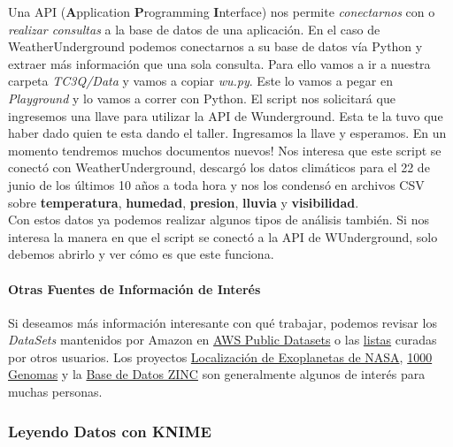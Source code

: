 \documentclass[10pt,letterpaper]{article}
\begin{document}
Una API (\textbf{A}pplication \textbf{P}rogramming \textbf{I}nterface) nos permite \emph{conectarnos} con o \emph{realizar consultas} a la base de datos de una aplicaci\'on. En el caso de WeatherUnderground podemos conectarnos a su base de datos v\'ia Python y extraer m\'as informaci\'on que una sola consulta. Para ello vamos a ir a nuestra carpeta \textit{TC3Q/Data} y vamos a copiar \textit{wu.py}. Este lo vamos a pegar en \textit{Playground} y lo vamos a correr con Python. El script nos solicitar\'a que ingresemos una llave para utilizar la API de Wunderground. Esta te la tuvo que haber dado quien te esta dando el taller. Ingresamos la llave y esperamos. En un momento tendremos muchos documentos nuevos! Nos interesa que este script se conect\'o con WeatherUnderground, descarg\'o los datos clim\'aticos para el 22 de junio de los \'ultimos 10 a\~nos a toda hora y nos los condens\'o en archivos CSV sobre \textbf{temperatura}, \textbf{humedad}, \textbf{presion}, \textbf{lluvia} y \textbf{visibilidad}.\\

Con estos datos ya podemos realizar algunos tipos de an\'alisis tambi\'en. Si nos interesa la manera en que el script se conect\'o a la API de WUnderground, solo debemos abrirlo y ver c\'omo es que este funciona.\\

\paragraph{Otras Fuentes de Informaci\'on de Inter\'es} Si deseamos m\'as informaci\'on interesante con qu\'e trabajar, podemos revisar los \emph{DataSets} mantenidos por Amazon en \href{https://aws.amazon.com/public-datasets/}{AWS Public Datasets} o las \href{https://github.com/caesar0301/awesome-public-datasets}{listas} curadas por otros usuarios. Los proyectos \href{https://exoplanetarchive.ipac.caltech.edu/docs/program_interfaces.html}{Localizaci\'on de Exoplanetas de NASA}, \href{http://www.internationalgenome.org/data}{1000 Genomas} y la \href{http://zinc.docking.org/browse/subsets/}{Base de Datos ZINC} son generalmente algunos de inter\'es para muchas personas.\\

\subsubsection{Leyendo Datos con KNIME}
\end{document}
